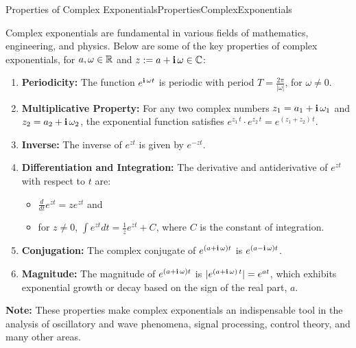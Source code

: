 \begin{propColor}{Properties of Complex Exponentials}{PropertiesComplexExponentials}

Complex exponentials are fundamental in various fields of mathematics, engineering, and physics. Below are some of the key properties of complex exponentials, for $a, \omega \in \mathbb R$ and
$z:= a + \mathop{\bm{\mathrm i}} \omega \in \mathbb C$:

\begin{enumerate}
\renewcommand{\labelenumi}{(\alph{enumi})}
\setlength{\itemsep}{.2cm}
   
    \item \textbf{Periodicity:} The function $e^{\mathop{\bm{\mathrm i}} \omega t}$ is periodic with period $T = \frac{2\pi}{|\omega|}$, for $\omega \neq 0$.

    \item \textbf{Multiplicative Property:} For any two complex numbers $z_1 = a_1 + \mathop{\bm{\mathrm i}} \omega_1$ and $z_2 = a_2 + \mathop{\bm{\mathrm i}} \omega_2$, the exponential function satisfies $e^{z_1\, t}\cdot e^{z_2 \, t} = e^{\left(z_1 + z_2\right)\, t}$.

    \item \textbf{Inverse:} The inverse of $e^{zt}$ is given by $e^{-zt}$.

    \item \textbf{Differentiation and Integration:} The derivative and antiderivative of $e^{zt}$ with respect to $t$ are: 
    \begin{itemize}
        \item $\frac{d}{dt}e^{zt} = ze^{zt}$ and 

        \item for $z \neq 0$, $\int e^{zt} dt = \frac{1}{z}e^{zt} + C$, where $C$ is the constant of integration.

    \end{itemize}
    \item \textbf{Conjugation:} The complex conjugate of $e^{\left(a + \mathop{\bm{\mathrm i}} \omega \right)t}$ is $e^{\left(a - \mathop{\bm{\mathrm i}} \omega \right)t}$.

    \item \textbf{Magnitude:} The magnitude of $e^{\left(a+ \mathop{\bm{\mathrm i}} \omega \right)t}$ is $|e^{\left(a+ \mathop{\bm{\mathrm i}} \omega \right)\, t}| = e^{at}$, which exhibits exponential growth or decay based on the sign of the real part,  $a$.
\end{enumerate}

\textbf{Note:} These properties make complex exponentials an indispensable tool in the analysis of oscillatory and wave phenomena, signal processing, control theory, and many other areas.

   
\end{propColor}

